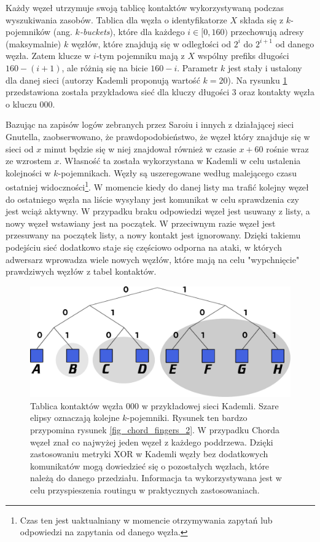 \documentclass[a4paper,11pt]{scrartcl}
\begin{document}
Każdy węzeł utrzymuje swoją tablicę kontaktów wykorzystywaną podczas wyszukiwania zasobów. Tablica dla węzła o identyfikatorze $X$ składa się z $k$-pojemników (ang. \textit{$k$-buckets}), które dla każdego $i \in [0, 160)$ przechowują adresy (maksymalnie) $k$ węzłów, które znajdują się w odległości od $2^i$ do $2^{i+1}$ od danego węzła. Zatem klucze w $i$-tym pojemniku mają z $X$ wspólny prefiks długości $160 - (i+1)$, ale różnią się na bicie $160 - i$. Parametr $k$ jest stały i ustalony dla danej sieci (autorzy Kademli proponują wartość $k=20$). Na rysunku \ref{fig_kademlia} przedstawiona została przykładowa sieć dla kluczy długości $3$ oraz kontakty węzła o kluczu $000$. 

Bazując na zapisów logów zebranych przez Saroiu i innych \cite{saroiu2001measurement} z działającej sieci Gnutella, zaobserwowano, że prawdopodobieństwo, że węzeł który znajduje się w sieci od $x$ minut będzie się w niej znajdował również w czasie $x+60$ rośnie wraz ze wzrostem $x$. Własność ta została wykorzystana w Kademli w celu ustalenia kolejności w $k$-pojemnikach. Węzły są uszeregowane według malejącego czasu ostatniej widoczności\footnote{Czas ten jest uaktualniany w momencie otrzymywania zapytań lub odpowiedzi na zapytania od danego węzła.}. W momencie kiedy do danej listy ma trafić kolejny węzeł do ostatniego węzła na liście wysyłany jest komunikat w celu sprawdzenia czy jest wciąż aktywny. W przypadku braku odpowiedzi węzeł jest usuwany z listy, a nowy węzeł wstawiany jest na początek. W przeciwnym razie węzeł jest przesuwany na początek listy, a nowy kontakt jest ignorowany. Dzięki takiemu podejściu sieć dodatkowo staje się częściowo odporna na ataki, w których adwersarz wprowadza wiele nowych węzłów, które mają na celu "wypchnięcie" prawdziwych węzłów z tabel kontaktów.

\begin{figure}[h]
\centering
\includegraphics[width=0.9\linewidth]{img/kademlia.pdf}
\caption{Tablica kontaktów węzła $000$ w przykładowej sieci Kademli. Szare elipsy oznaczają kolejne $k$-pojemniki. Rysunek ten bardzo przypomina rysunek \ref{fig_chord_fingers_2}. W przypadku Chorda węzeł znał co najwyżej jeden węzeł z każdego poddrzewa. Dzięki zastosowaniu metryki XOR w Kademli węzły bez dodatkowych komunikatów mogą dowiedzieć się o pozostałych węzłach, które należą do danego przedziału. Informacja ta wykorzystywana jest w celu przyspieszenia routingu w praktycznych zastosowaniach.}
\label{fig_kademlia}
\end{figure}
\end{document}
